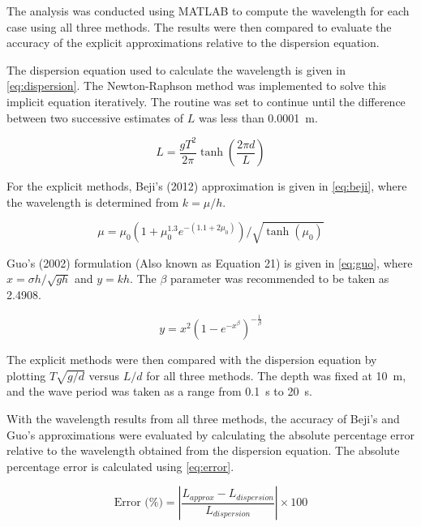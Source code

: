 \documentclass[a4paper, 11pt]{article}
\begin{document}
The analysis was conducted using MATLAB to compute the wavelength for each case using all three methods. The results were then compared to evaluate the accuracy of the explicit approximations relative to the dispersion equation.

The dispersion equation used to calculate the wavelength is given in \autoref{eq:dispersion}. The Newton-Raphson method was implemented to solve this implicit equation iteratively. The routine was set to continue until the difference between two successive estimates of $L$ was less than 0.0001~m.

\begin{equation}
    L = \frac{g T^2}{2\pi} \tanh\left(\frac{2\pi d}{L}\right)
    \label{eq:dispersion}
\end{equation}

For the explicit methods, Beji's (2012) approximation is given in \autoref{eq:beji}, where the wavelength is determined from $k = \mu / h$.

\begin{equation}
    \mu = \mu_0 \left( 1 + \mu_0^{1.3} e^{-(1.1 + 2\mu_0)} \right) / \sqrt{\tanh(\mu_0)}
    \label{eq:beji}
\end{equation}

Guo's (2002) formulation (Also known as Equation 21) is given in \autoref{eq:guo}, where $x = \sigma h / \sqrt{gh}$ and $y = kh$. The $\beta$ parameter was recommended to be taken as 2.4908.

\begin{equation}
    y = x^2 \left(1 - e^{-x^\beta}\right)^{-\frac{1}{\beta}}
    \label{eq:guo}
\end{equation}

The explicit methods were then compared with the dispersion equation by plotting $T \sqrt{g/d}$ versus $L/d$ for all three methods. The depth was fixed at 10~m, and the wave period was taken as a range from 0.1~s to 20~s.

With the wavelength results from all three methods, the accuracy of Beji's and Guo's approximations were evaluated by calculating the absolute percentage error relative to the wavelength obtained from the dispersion equation. The absolute percentage error is calculated using \autoref{eq:error}.

\begin{equation}
    \text{Error (\%)} = \left| \frac{L_{approx} - L_{dispersion}}{L_{dispersion}} \right| \times 100
    \label{eq:error}
\end{equation}
\end{document}
